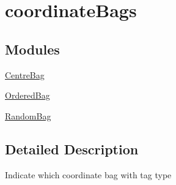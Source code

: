 \hypertarget{group__coordinate_bags}{
\section{coordinateBags}
\label{dc/da9/group__coordinate_bags}
}
\subsection*{Modules}
\begin{DoxyCompactItemize}
\item 
\hyperlink{group___centre_bag}{CentreBag}
\item 
\hyperlink{group___ordered_bag}{OrderedBag}
\item 
\hyperlink{group___random_bag}{RandomBag}
\end{DoxyCompactItemize}


\subsection{Detailed Description}
Indicate which coordinate bag with tag type 